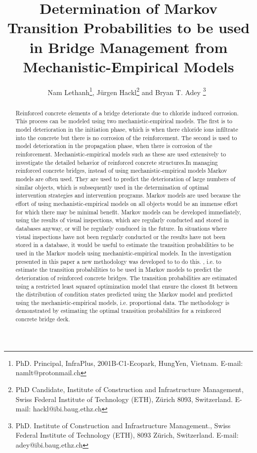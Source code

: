 \documentclass[Journal]{ascelike}
\begin{document}
\title{Determination of Markov Transition Probabilities to be used in Bridge
Management from Mechanistic-Empirical Models}%
\author{
Nam Lethanh\thanks{PhD. Principal, InfraPlus, 2001B-C1-Ecopark, HungYen, Vietnam. E-mail: namlt@protonmail.ch}, J\"{u}rgen Hackl\thanks{PhD Candidate, Institute of Construction and Infrastructure Management,
Swiss Federal Institute of Technology (ETH), Z\"{u}rich 8093, Switzerland. E-mail: hackl@ibi.baug.ethz.ch} and Bryan T. Adey%
\thanks{PhD. Institute of Construction and Infrastructure Management., Swiss Federal 
Institute of Technology (ETH), 8093 Z\"{u}rich, Switzerland. E-mail: adey@ibi.baug.ethz.ch}\
}
%
\maketitle
%
\begin{abstract}
Reinforced concrete elements of a bridge deteriorate due to chloride
induced corrosion. This process can be modeled using two mechanistic-empirical
models. The first is to model deterioration in the initiation phase,
which is when there chloride ions infiltrate into the concrete but
there is no corrosion of the reinforcement. The second is used to
model deterioration in the propagation phase, when there is corrosion
of the reinforcement. Mechanistic-empirical models such as these are
used extensively to investigate the detailed behavior of reinforced
concrete structures.In managing reinforced concrete bridges, instead
of using mechanistic-empirical models Markov models are often used.
They are used to predict the deterioration of large numbers of similar
objects, which is subsequently used in the determination of optimal
intervention strategies and intervention programs. Markov models are
used because the effort of using mechanistic-empirical models on all
objects would be an immense effort for which there may be minimal
benefit. Markov models can be developed immediately, using the results
of visual inspections, which are regularly conducted and stored in
databases anyway, or will be regularly conduced in the future. In
situations where visual inspections have not been regularly conducted
or the results have not been stored in a database, it would be useful
to estimate the transition probabilities to be used in the Markov
models using mechanistic-empirical models. In the investigation presented
in this paper a new methodology was developed to to do this. , i.e.
to estimate the transition probabilities to be used in Markov models
to predict the deterioration of reinforced concrete bridges. The transition
probabilities are estimated using a restricted least squared optimization
model that ensure the closest fit between the distribution of condition
states predicted using the Markov model and predicted using the mechanistic-empirical
models, i.e. proportional data. The methodology is demonstrated by
estimating the optimal transition probabilities for a reinforced concrete
bridge deck. 
\end{abstract}
%
%
%
\end{document}

